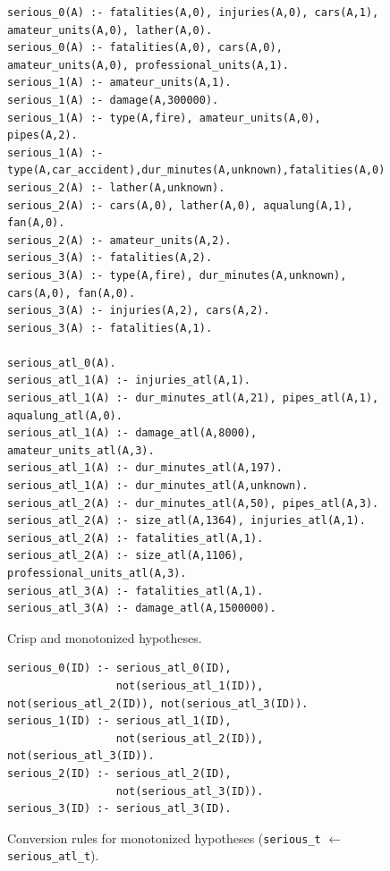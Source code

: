 \begin{figure}
\begin{verbatim}
serious_0(A) :- fatalities(A,0), injuries(A,0), cars(A,1), amateur_units(A,0), lather(A,0).
serious_0(A) :- fatalities(A,0), cars(A,0), amateur_units(A,0), professional_units(A,1).
serious_1(A) :- amateur_units(A,1).
serious_1(A) :- damage(A,300000).
serious_1(A) :- type(A,fire), amateur_units(A,0), pipes(A,2).
serious_1(A) :- type(A,car_accident),dur_minutes(A,unknown),fatalities(A,0),injuries(A,1).
serious_2(A) :- lather(A,unknown).
serious_2(A) :- cars(A,0), lather(A,0), aqualung(A,1), fan(A,0).
serious_2(A) :- amateur_units(A,2).
serious_3(A) :- fatalities(A,2).
serious_3(A) :- type(A,fire), dur_minutes(A,unknown), cars(A,0), fan(A,0).
serious_3(A) :- injuries(A,2), cars(A,2).
serious_3(A) :- fatalities(A,1).

serious_atl_0(A).
serious_atl_1(A) :- injuries_atl(A,1).
serious_atl_1(A) :- dur_minutes_atl(A,21), pipes_atl(A,1), aqualung_atl(A,0).
serious_atl_1(A) :- damage_atl(A,8000), amateur_units_atl(A,3).
serious_atl_1(A) :- dur_minutes_atl(A,197).
serious_atl_1(A) :- dur_minutes_atl(A,unknown).
serious_atl_2(A) :- dur_minutes_atl(A,50), pipes_atl(A,3).
serious_atl_2(A) :- size_atl(A,1364), injuries_atl(A,1).
serious_atl_2(A) :- fatalities_atl(A,1).
serious_atl_2(A) :- size_atl(A,1106), professional_units_atl(A,3).
serious_atl_3(A) :- fatalities_atl(A,1).
serious_atl_3(A) :- damage_atl(A,1500000).
\end{verbatim}
\caption{Crisp and monotonized hypotheses.}
\label{img:rules}
\end{figure}


\begin{figure}	
\begin{verbatim}
serious_0(ID) :- serious_atl_0(ID),
                 not(serious_atl_1(ID)), not(serious_atl_2(ID)), not(serious_atl_3(ID)).
serious_1(ID) :- serious_atl_1(ID),
                 not(serious_atl_2(ID)), not(serious_atl_3(ID)).
serious_2(ID) :- serious_atl_2(ID),
                 not(serious_atl_3(ID)).
serious_3(ID) :- serious_atl_3(ID).
\end{verbatim}						
\caption{Conversion rules for monotonized hypotheses (\texttt{serious\_t} $\leftarrow$ \texttt{serious\_atl\_t}).}
\label{img:conversion}
\end{figure}



